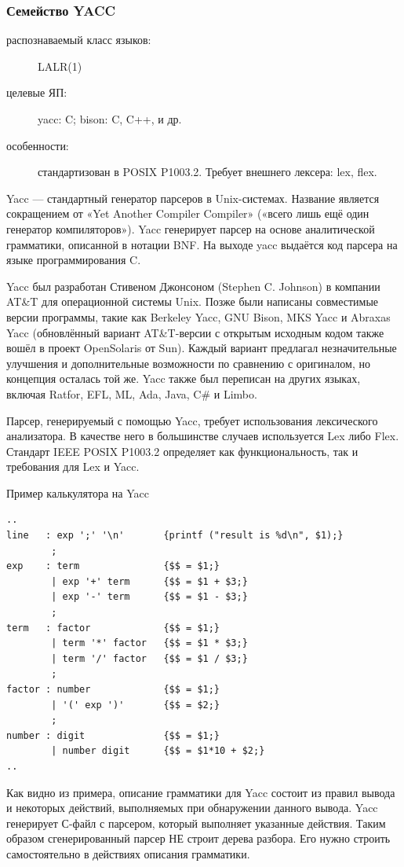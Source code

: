 \documentclass[a4paper,12pt,titlepage]{extarticle}
\begin{document}
\subsubsection*{Семейство YACC}
\begin{description}
  \item[распознаваемый класс языков:] LALR(1)
  \item[целевые ЯП:] yacc: C; bison: C, C++, и др.
  \item[особенности:] стандартизован в POSIX P1003.2. Требует внешнего лексера: lex, flex.
\end{description}
Yacc — стандартный генератор парсеров в Unix-системах. Название является
сокращением от «Yet Another Compiler Compiler» («всего лишь ещё один генератор
компиляторов»). Yacc генерирует парсер на основе аналитической грамматики,
описанной в нотации BNF. На выходе yacc выдаётся код парсера на языке
программирования C.

Yacc был разработан Стивеном Джонсоном (Stephen C. Johnson) в компании AT\&T
для операционной системы Unix. Позже были написаны совместимые версии
программы, такие как Berkeley Yacc, GNU Bison, MKS Yacc и Abraxas Yacc
(обновлённый вариант AT\&T-версии с открытым исходным кодом также вошёл в
проект OpenSolaris от Sun). Каждый вариант предлагал незначительные улучшения и
дополнительные возможности по сравнению с оригиналом, но концепция осталась той
же. Yacc также был переписан на других языках, включая Ratfor, EFL, ML, Ada,
Java, C\# и Limbo.

Парсер, генерируемый с помощью Yacc, требует использования лексического
анализатора. В качестве него в большинстве случаев используется Lex либо
Flex. Стандарт IEEE POSIX P1003.2 определяет как функциональность, так и
требования для Lex и Yacc.

Пример калькулятора на Yacc
\begin{verbatim}
..
line   : exp ';' '\n'       {printf ("result is %d\n", $1);}
        ;
exp    : term               {$$ = $1;}
        | exp '+' term      {$$ = $1 + $3;}
        | exp '-' term      {$$ = $1 - $3;}
        ;
term   : factor             {$$ = $1;}
        | term '*' factor   {$$ = $1 * $3;}
        | term '/' factor   {$$ = $1 / $3;}
        ;
factor : number             {$$ = $1;}
        | '(' exp ')'       {$$ = $2;}
        ;
number : digit              {$$ = $1;}
        | number digit      {$$ = $1*10 + $2;}
..
\end{verbatim}

Как видно из примера, описание грамматики для Yacc состоит из правил вывода и
некоторых действий, выполняемых при обнаружении данного вывода.
Yacc генерирует С-файл с парсером, который выполняет указанные действия.
Таким образом сгенерированный парсер НЕ строит дерева разбора. Его нужно строить
самостоятельно в действиях описания грамматики.
\end{document}

